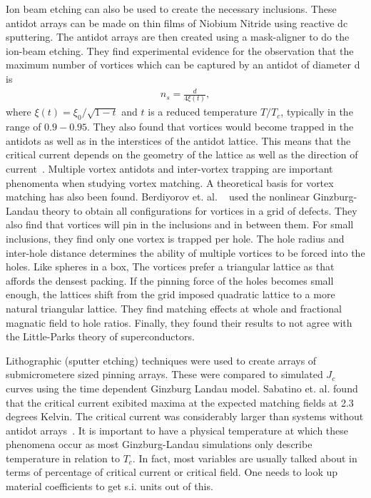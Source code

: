 Ion beam etching can also be used to create the necessary inclusions. These antidot arrays can be made on thin films of Niobium Nitride using reactive dc sputtering. The antidot arrays are then created using a mask-aligner to do the ion-beam etching. They find experimental evidence for the observation that the maximum number of vortices which can be captured by an antidot of diameter d is
\begin{eqnarray}
n_s = \frac {d} {4 \xi(t)}, 
\label{}
\end{eqnarray}
where $\xi(t) = \xi_0 / \sqrt{1-t}$ and $t$ is a reduced temperature $T/T_c$, typically in the range of $0.9 - 0.95$. They also found that vortices would become trapped in the antidots as well as in the interstices of the antidot lattice. This means that the critical current depends on the geometry of the lattice as well as the direction of current~\cite{Thakur09}. Multiple vortex antidots and inter-vortex trapping are important phenomenta when studying vortex matching. A theoretical basis for vortex matching has also been found. Berdiyorov et. al. ~\cite{Berdiyorov06} used the nonlinear Ginzburg-Landau theory to obtain all configurations for vortices in a grid of defects. They also find that vortices will pin in the inclusions and in between them. For small inclusions, they find only one vortex is trapped per hole. The hole radius and inter-hole distance determines the ability of multiple vortices to be forced into the holes. Like spheres in a box, The vortices prefer a triangular lattice as that affords the densest packing. If the pinning force of the holes becomes small enough, the lattices shift from the grid imposed quadratic lattice to a more natural triangular lattice. They find matching effects at whole and fractional magnatic field to hole ratios. Finally, they found their results to not agree with the Little-Parks theory of superconductors.

Lithographic (sputter etching) techniques were used to create arrays of submicrometere sized pinning arrays. These were compared to simulated $J_c$ curves using the time dependent Ginzburg Landau model. Sabatino et. al. found that the critical current exibited maxima at the expected matching fields at 2.3 degrees Kelvin. The critical current was considerably larger than systems without antidot arrays~\cite{Sabatino10}.
It is important to have a physical temperature at which these phenomena occur as most Ginzburg-Landau simulations only describe temperature in relation to $T_c$. In fact, most variables are usually talked about in terms of percentage of critical current or critical field. One needs to look up material coefficients to get s.i. units out of this. 

